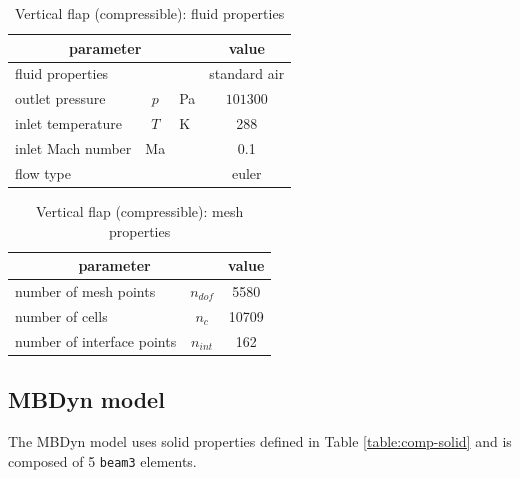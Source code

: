 \begin{table}[!htb]
	\begin{center}
		\begin{tabular}{ l c l | c } 
			\multicolumn{3}{c|}{parameter} & value  \\ 
			\hline
			fluid properties  &  &  & standard air   \\
			outlet pressure & $p$& \si{Pa} & $101300$  \\
			inlet temperature & $T$ & \si{K} & 288  \\
			inlet Mach number &  Ma &  & 0.1 \\
			flow type & & & euler \\
		\end{tabular}
	\end{center}
	\caption{Vertical flap (compressible): fluid properties}
	\label{table:comp-fluid}
\end{table}



\begin{table}[!htb]
	\begin{center}
		\begin{tabular}{ l c | c } 
			\multicolumn{2}{c|}{parameter} & value   \\ 
			\hline
			number of mesh points  & $n_{dof}$ & 5580     \\
			number of cells & $n_c$ & 10709  \\
			number of interface points  & $n_{int}$ & 162  \\			
		\end{tabular}
	\end{center}
	\caption{Vertical flap (compressible): mesh properties}
	\label{table:comp-mesh}
\end{table}


\subsection{MBDyn model}


The MBDyn model uses solid properties defined in Table \ref{table:comp-solid} and is composed of 5 \texttt{beam3} elements. 


